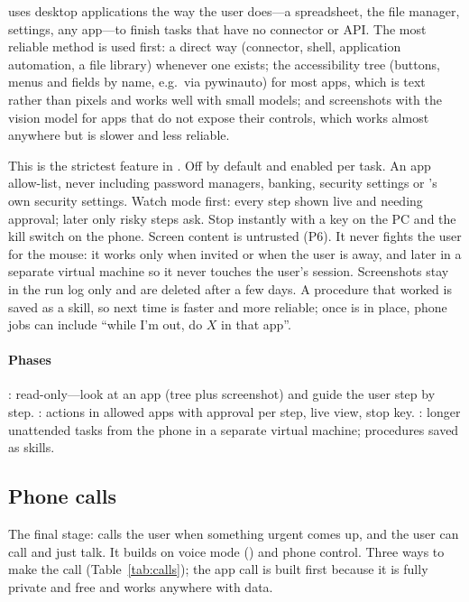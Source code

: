 \hivi{} uses desktop applications the way the user does---a spreadsheet, the file manager, settings, any app---to finish tasks that have no connector or API. The most reliable method is used first: a direct way (connector, shell, application automation, a file library) whenever one exists; the accessibility tree (buttons, menus and fields by name, e.g.\ via pywinauto) for most apps, which is text rather than pixels and works well with small models; and screenshots with the vision model for apps that do not expose their controls, which works almost anywhere but is slower and less reliable.

This is the strictest feature in \hivi{}. Off by default and enabled per task. An app allow-list, never including password managers, banking, security settings or \hivi{}'s own security settings. Watch mode first: every step shown live and needing approval; later only risky steps ask. Stop instantly with a key on the PC and the kill switch on the phone. Screen content is untrusted (P6). It never fights the user for the mouse: it works only when invited or when the user is away, and later in a separate virtual machine so it never touches the user's session. Screenshots stay in the run log only and are deleted after a few days. A procedure that worked is saved as a skill, so next time is faster and more reliable; once  is in place, phone jobs can include ``while I'm out, do $X$ in that app''.

\paragraph{Phases} : read-only---look at an app (tree plus screenshot) and guide the user step by step. : actions in allowed apps with approval per step, live view, stop key. : longer unattended tasks from the phone in a separate virtual machine; procedures saved as skills.

\subsection{Phone calls}

The final stage: \hivi{} calls the user when something urgent comes up, and the user can call \hivi{} and just talk. It builds on voice mode () and phone control. Three ways to make the call (Table~\ref{tab:calls}); the app call is built first because it is fully private and free and works anywhere with data.


